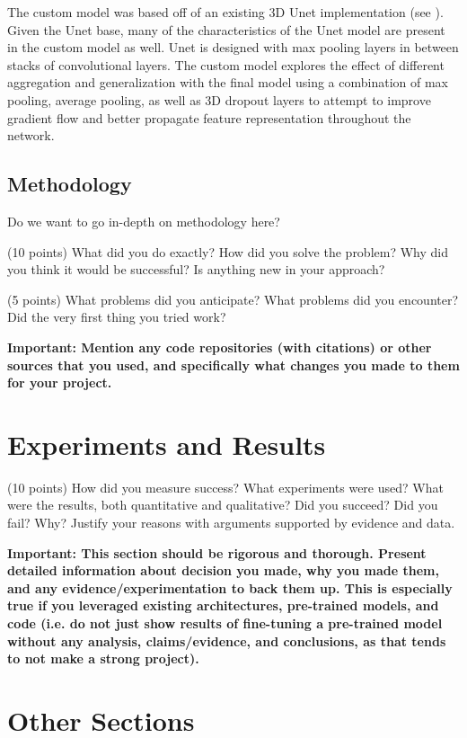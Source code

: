 \documentclass[10pt,twocolumn,letterpaper]{article}
\begin{document}
The custom model was based off of an existing 3D Unet implementation (see \cite{10.7554/eLife.57613}). Given the Unet base, many of the characteristics of the Unet model are present in the custom model as well. Unet is designed with max pooling layers in between stacks of convolutional layers. The custom model explores the effect of different aggregation and generalization with the final model using a combination of max pooling, average pooling, as well as 3D dropout layers to attempt to improve gradient flow and better propagate feature representation throughout the network.


\subsection{Methodology}

Do we want to go in-depth on methodology here?


(10 points) What did you do exactly? How did you solve the problem? Why did you think it would be successful? Is anything new in your approach? 

(5 points) What problems did you anticipate? What problems did you encounter? Did the very first thing you tried work? 

\textbf{Important: Mention any code repositories (with citations) or other sources that you used, and specifically what changes you made to them for your project. }

\section{Experiments and Results}

(10 points) How did you measure success? What experiments were used? What were the results, both quantitative and qualitative? Did you succeed? Did you fail? Why? Justify your reasons with arguments supported by evidence and data.

\textbf{Important: This section should be rigorous and thorough. Present detailed information about decision you made, why you made them, and any evidence/experimentation to back them up. This is especially true if you leveraged existing architectures, pre-trained models, and code (i.e. do not just show results of fine-tuning a pre-trained model without any analysis, claims/evidence, and conclusions, as that tends to not make a strong project). }

\section{Other Sections}
\end{document}
